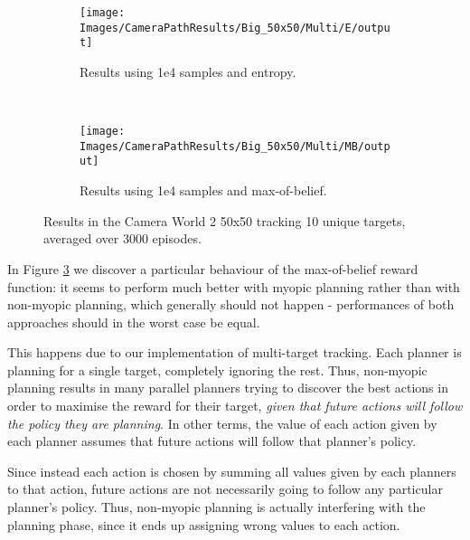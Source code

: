 \begin{figure}[ht]
        \centering
        \begin{subfigure}[t]{0.5\textwidth}
                \texttt{[image: Images/CameraPathResults/Big\_50x50/Multi/E/output]}
                \caption{Results using 1e4 samples and entropy.}
                \label{fig:cpb4e10}
        \end{subfigure}%
        ~ %
        \begin{subfigure}[t]{0.5\textwidth}
                \texttt{[image: Images/CameraPathResults/Big\_50x50/Multi/MB/output]}
                \caption{Results using 1e4 samples and max-of-belief.}
                \label{fig:cpb5mb10}
        \end{subfigure}
        \caption{Results in the Camera World 2 50x50 tracking 10 unique targets, averaged over 3000 episodes.}\label{fig:cpb10}
\end{figure}

In Figure \ref{fig:cpb10} we discover a particular behaviour of the max-of-belief reward function:
it seems to perform much better with myopic planning rather than with non-myopic planning, which
generally should not happen - performances of both approaches should in the worst case be equal.

This happens due to our implementation of multi-target tracking. Each planner is planning for a
single target, completely ignoring the rest. Thus, non-myopic planning results in many parallel
planners trying to discover the best actions in order to maximise the reward for their target,
\textit{given that future actions will follow the policy they are planning}. In other terms, the
value of each action given by each planner assumes that future actions will follow that planner's
policy.

Since instead each action is chosen by summing all values given by each planners to that action,
future actions are not necessarily going to follow any particular planner's policy. Thus, non-myopic
planning is actually interfering with the planning phase, since it ends up assigning wrong values to
each action.

